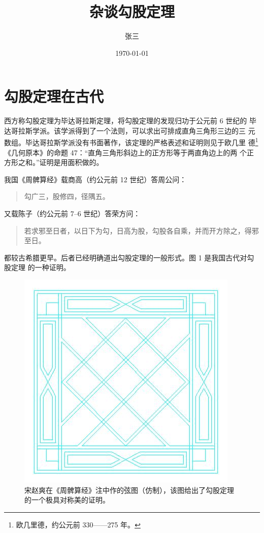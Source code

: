 \documentclass[UTF8]{ctexart}
\title{杂谈勾股定理}
\author{张三}
\date{\today}
\begin{document}
\maketitle
\tableofcontents
\section{勾股定理在古代}
西方称勾股定理为毕达哥拉斯定理，将勾股定理的发现归功于公元前 6 世纪的
毕达哥拉斯学派。该学派得到了一个法则，可以求出可排成直角三角形三边的三
元数组。毕达哥拉斯学派没有书面著作，该定理的严格表述和证明则见于欧几里
德\footnote{欧几里德，约公元前 330——275 年。}《几何原本》的命题 47：“直角三角形斜边上的正方形等于两直角边上的两
个正方形之和。”证明是用面积做的。

我国《周髀算经》载商高（约公元前 12 世纪）答周公问：
\begin{quote}
\kaishu 勾广三，股修四，径隅五。
\end{quote}
又载陈子（约公元前 7--6 世纪）答荣方问：
\begin{quote}
\kaishu 若求邪至日者，以日下为勾，日高为股，勾股各自乘，并而开方除之，得邪至日。
\end{quote}
都较古希腊更早。后者已经明确道出勾股定理的一般形式。图 1 是我国古代对勾股定理
的一种证明。

\begin{figure}[ht]
  \centering
  \includegraphics[scale=0.6]{test_image.jpg}
  \caption{宋赵爽在《周髀算经》注中作的弦图（仿制），该图给出了勾股定理的一个极具对称美的证明。}
  \label{fig:xiantu}
\end{figure}
\end{document}
